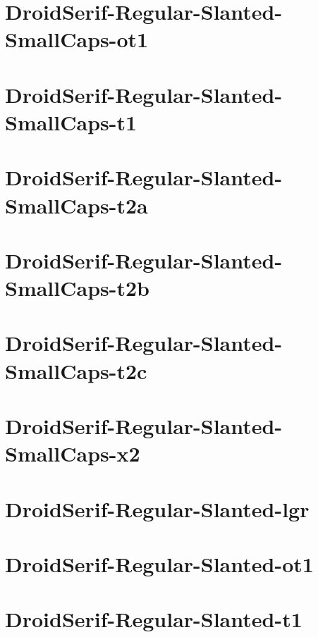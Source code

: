 \documentclass{article}
\begin{document}
\section{DroidSerif-Regular-Slanted-SmallCaps-ot1}

\section{DroidSerif-Regular-Slanted-SmallCaps-t1}

\section{DroidSerif-Regular-Slanted-SmallCaps-t2a}

\section{DroidSerif-Regular-Slanted-SmallCaps-t2b}

\section{DroidSerif-Regular-Slanted-SmallCaps-t2c}

\section{DroidSerif-Regular-Slanted-SmallCaps-x2}

\section{DroidSerif-Regular-Slanted-lgr}

\section{DroidSerif-Regular-Slanted-ot1}

\section{DroidSerif-Regular-Slanted-t1}
\end{document}
